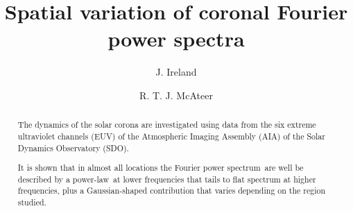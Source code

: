 \documentclass[onecolumn]{emulateapj}
\newcommand{\PS}{power spectrum}
\newcommand{\PL}{power-law}
\newcommand{\Fps}{Fourier \PS}
\begin{document}

\title{Spatial variation of coronal Fourier power spectra}


\author{J. Ireland}

\author{R. T. J. McAteer}



\begin{abstract}
The dynamics of the solar corona are investigated using data from the
six extreme ultraviolet channels (EUV) of the  Atmospheric Imaging
Assembly (AIA) of the Solar Dynamics Observatory (SDO).


It is shown that in almost all locations the \Fps\ are well be described by
a \PL\ at lower frequencies that tails to flat spectrum at higher
frequencies, plus a Gaussian-shaped contribution that varies depending
on the region studied.


\end{abstract}



\end{document}
